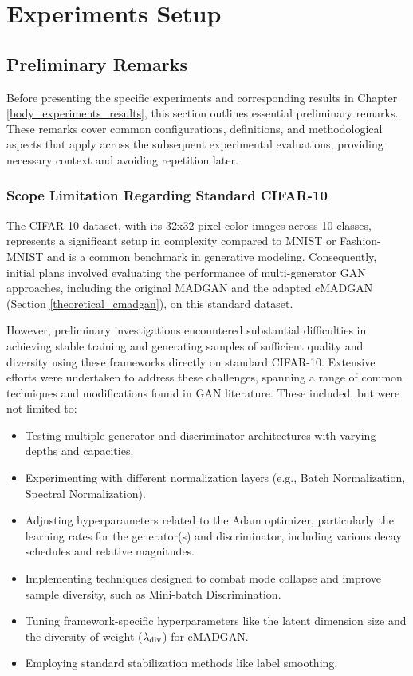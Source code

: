\section{Experiments Setup}\label{body_experiments_setup}

\subsection{Preliminary Remarks}\label{body_prelim}
Before presenting the specific experiments and corresponding results in Chapter \ref{body_experiments_results}, this section outlines essential preliminary remarks. These remarks cover common configurations, definitions, and methodological aspects that apply across the subsequent experimental evaluations, providing necessary context and avoiding repetition later.

\subsubsection{Scope Limitation Regarding Standard CIFAR-10}
\label{setup_cifar10_scope}

The CIFAR-10 dataset, with its 32x32 pixel color images across 10 classes, represents a significant setup  in complexity compared to MNIST or Fashion-MNIST and is a common benchmark in generative modeling. Consequently, initial plans involved evaluating the performance of multi-generator GAN approaches, including the original MADGAN \cite{ghosh2018madgan} and the adapted cMADGAN (Section \ref{theoretical_cmadgan}), on this standard dataset.

However, preliminary investigations encountered substantial difficulties in achieving stable training and generating samples of sufficient quality and diversity using these frameworks directly on standard CIFAR-10. Extensive efforts were undertaken to address these challenges, spanning a range of common techniques and modifications found in GAN literature. These included, but were not limited to:

\begin{itemize}
    \item Testing multiple generator and discriminator architectures with varying depths and capacities.
    \item Experimenting with different normalization layers (e.g., Batch Normalization, Spectral Normalization).
    \item Adjusting hyperparameters related to the Adam optimizer, particularly the learning rates for the generator(s) and discriminator, including various decay schedules and relative magnitudes.
    \item Implementing techniques designed to combat mode collapse and improve sample diversity, such as Mini-batch Discrimination.
    \item Tuning framework-specific hyperparameters like the latent dimension size and the diversity of weight (\( \lambda_{\text{div}} \)) for cMADGAN.
    \item Employing standard stabilization methods like label smoothing.
\end{itemize}

